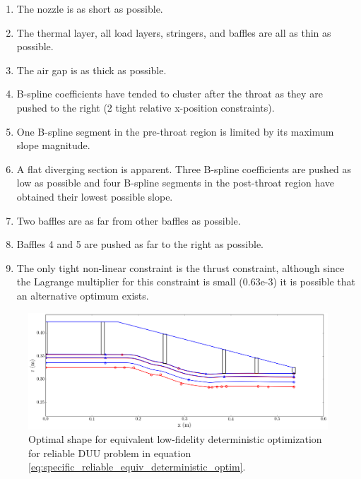 \documentclass{article}
\begin{document}
\begin{enumerate}
\item The nozzle is as short as possible.
\item The thermal layer, all load layers, stringers, and baffles are all as thin as possible.
\item The air gap is as thick as possible.
\item B-spline coefficients have tended to cluster after the throat as they are pushed to the right (2 tight relative x-position constraints).
\item One B-spline segment in the pre-throat region is limited by its maximum slope magnitude.
\item A flat diverging section is apparent. Three B-spline coefficients are pushed as low as possible and four B-spline segments in the post-throat region have obtained their lowest possible slope.
\item Two baffles are as far from other baffles as possible.
\item Baffles 4 and 5 are pushed as far to the right as possible.
\item The only tight non-linear constraint is the thrust constraint, although since the Lagrange multiplier for this constraint is small (0.63e-3) it is possible that an alternative optimum exists.
\end{enumerate}

\begin{figure}
\caption{Optimal shape for equivalent low-fidelity deterministic optimization for reliable DUU problem in equation \ref{eq:specific_reliable_equiv_deterministic_optim}.}
\label{fig:det-lo-optimal-shape}
\begin{center}
\includegraphics[scale=0.35]{figs/det-lo-optimal-shape.png}
\end{center}
\end{figure}
\end{document}
